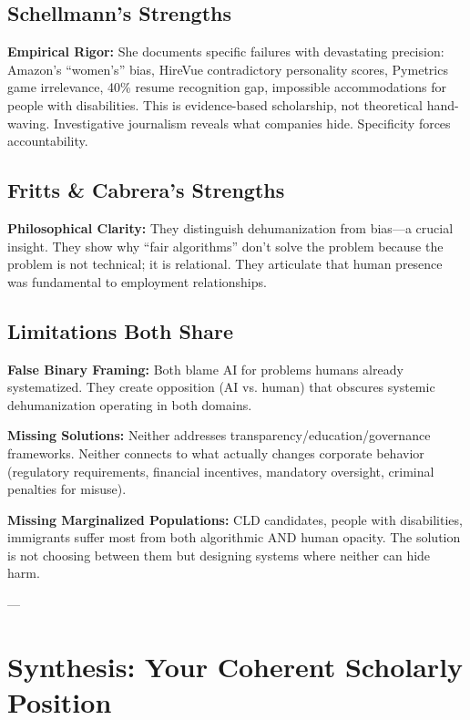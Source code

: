 \documentclass[11pt,twoside]{article}
\begin{document}
\subsection{Schellmann's Strengths}

\textbf{Empirical Rigor:} She documents specific failures with devastating precision: Amazon's ``women's'' bias, HireVue contradictory personality scores, Pymetrics game irrelevance, 40\% resume recognition gap, impossible accommodations for people with disabilities. This is evidence-based scholarship, not theoretical hand-waving. Investigative journalism reveals what companies hide. Specificity forces accountability.

\subsection{Fritts \& Cabrera's Strengths}

\textbf{Philosophical Clarity:} They distinguish dehumanization from bias---a crucial insight. They show why ``fair algorithms'' don't solve the problem because the problem is not technical; it is relational. They articulate that human presence was fundamental to employment relationships.

\subsection{Limitations Both Share}

\textbf{False Binary Framing:} Both blame AI for problems humans already systematized. They create opposition (AI vs. human) that obscures systemic dehumanization operating in both domains.

\textbf{Missing Solutions:} Neither addresses transparency/education/governance frameworks. Neither connects to what actually changes corporate behavior (regulatory requirements, financial incentives, mandatory oversight, criminal penalties for misuse).

\textbf{Missing Marginalized Populations:} CLD candidates, people with disabilities, immigrants suffer most from both algorithmic AND human opacity. The solution is not choosing between them but designing systems where neither can hide harm.

---

\section{Synthesis: Your Coherent Scholarly Position}
\end{document}
